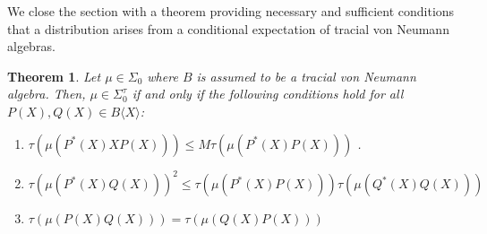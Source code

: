 \documentclass[11pt]{amsart}
\newtheorem{theorem}{Theorem}[section]
\begin{document}
We close the section with a theorem providing necessary and sufficient conditions that a distribution arises from a conditional expectation
of tracial von Neumann algebras.

\begin{theorem}
Let $\mu \in \Sigma_{0}$ where $B$ is assumed to be a tracial von Neumann algebra.  
Then, $\mu \in \Sigma_{0}^{\tau}$ if and only if the following conditions hold for all $P(X), Q(X) \in B\langle X \rangle$:
\begin{enumerate}
 \item $\tau(\mu(P^{\ast}(X)XP(X))) \leq M \tau(\mu(P^{\ast}(X)P(X)))$ .

\item  $\tau(\mu(P^{\ast}(X)Q(X)))^{2} \leq \tau(\mu(P^{\ast}(X)P(X))) \tau(\mu(Q^{\ast}(X)Q(X)))  $

\item  $\tau(\mu(P(X)Q(X))) = \tau(\mu(Q(X)P(X)))$
\end{enumerate}

\end{theorem}
\end{document}
